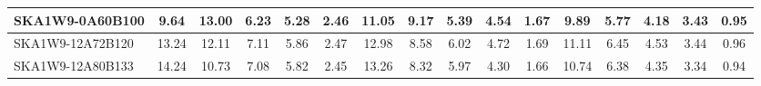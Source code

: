 \begin{table}[H]
{{\begin{tabular}{|lccccc||ccccc||ccccc|}
SKA1W9-0A60B100 & 9.64 \cellcolor{blue!29.04} & 13.00 \cellcolor{red!46.84} & 6.23 \cellcolor{green!18.00} & 5.28 \cellcolor{orange!18.00} & 2.46 \cellcolor{purple!24.30} & 11.05 \cellcolor{blue!38.21} & 9.17 \cellcolor{red!36.11} & 5.39 \cellcolor{green!18.00} & 4.54 \cellcolor{orange!31.44} & 1.67 \cellcolor{purple!21.82} & 9.89 \cellcolor{blue!47.19} & 5.77 \cellcolor{red!18.00} & 4.18 \cellcolor{green!18.00} & 3.43 \cellcolor{orange!22.78} & 0.95 \cellcolor{purple!32.00}\\ \hline 
SKA1W9-12A72B120 & 13.24 \cellcolor{blue!53.27} & 12.11 \cellcolor{red!40.58} & 7.11 \cellcolor{green!49.59} & 5.86 \cellcolor{orange!50.48} & 2.47 \cellcolor{purple!26.40} & 12.98 \cellcolor{blue!57.24} & 8.58 \cellcolor{red!28.84} & 6.02 \cellcolor{green!51.07} & 4.72 \cellcolor{orange!41.52} & 1.69 \cellcolor{purple!29.45} & 11.11 \cellcolor{blue!60.00} & 6.45 \cellcolor{red!42.41} & 4.53 \cellcolor{green!39.00} & 3.44 \cellcolor{orange!23.32} & 0.96 \cellcolor{purple!39.00}\\ \hline 
SKA1W9-12A80B133 & 14.24 \cellcolor{blue!60.00} & 10.73 \cellcolor{red!30.87} & 7.08 \cellcolor{green!48.51} & 5.82 \cellcolor{orange!48.24} & 2.45 \cellcolor{purple!22.20} & 13.26 \cellcolor{blue!60.00} & 8.32 \cellcolor{red!25.64} & 5.97 \cellcolor{green!48.45} & 4.30 \cellcolor{orange!18.00} & 1.66 \cellcolor{purple!18.00} & 10.74 \cellcolor{blue!56.12} & 6.38 \cellcolor{red!39.90} & 4.35 \cellcolor{green!28.20} & 3.34 \cellcolor{orange!18.00} & 0.94 \cellcolor{purple!25.00}\\ \hline 
\end{tabular}}
\vspace{-0.300000cm}
\hspace{1cm} 
}
\end{table}
